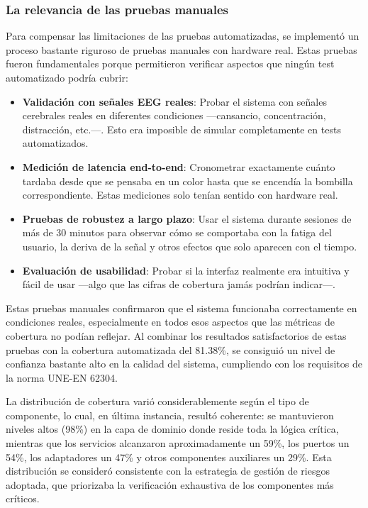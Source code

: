 \subsubsection{La relevancia de las pruebas manuales}

Para compensar las limitaciones de las pruebas automatizadas, se implementó un proceso bastante riguroso de pruebas manuales con hardware real. Estas pruebas fueron fundamentales porque permitieron verificar aspectos que ningún test automatizado podría cubrir:

\begin{itemize}
    \item \textbf{Validación con señales EEG reales}: Probar el sistema con señales cerebrales reales en diferentes condiciones —cansancio, concentración, distracción, etc.—. Esto era imposible de simular completamente en tests automatizados.
    
    \item \textbf{Medición de latencia end-to-end}: Cronometrar exactamente cuánto tardaba desde que se pensaba en un color hasta que se encendía la bombilla correspondiente. Estas mediciones solo tenían sentido con hardware real.
    
    \item \textbf{Pruebas de robustez a largo plazo}: Usar el sistema durante sesiones de más de 30 minutos para observar cómo se comportaba con la fatiga del usuario, la deriva de la señal y otros efectos que solo aparecen con el tiempo.
    
    \item \textbf{Evaluación de usabilidad}: Probar si la interfaz realmente era intuitiva y fácil de usar —algo que las cifras de cobertura jamás podrían indicar—.
\end{itemize}

Estas pruebas manuales confirmaron que el sistema funcionaba correctamente en condiciones reales, especialmente en todos esos aspectos que las métricas de cobertura no podían reflejar. Al combinar los resultados satisfactorios de estas pruebas con la cobertura automatizada del 81.38\%, se consiguió un nivel de confianza bastante alto en la calidad del sistema, cumpliendo con los requisitos de la norma UNE-EN 62304.

La distribución de cobertura varió considerablemente según el tipo de componente, lo cual, en última instancia, resultó coherente: se mantuvieron niveles altos (98\%) en la capa de dominio donde reside toda la lógica crítica, mientras que los servicios alcanzaron aproximadamente un 59\%, los puertos un 54\%, los adaptadores un 47\% y otros componentes auxiliares un 29\%. Esta distribución se consideró consistente con la estrategia de gestión de riesgos adoptada, que priorizaba la verificación exhaustiva de los componentes más críticos.

